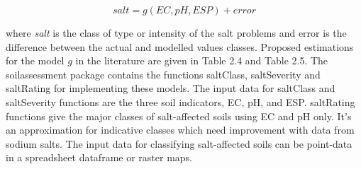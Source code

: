 \documentclass[
  10pt,
  b5paper,
]{book}
\newenvironment{Shaded}{\begin{snugshade}}{\end{snugshade}}
\newcommand{\CommentTok}[1]{\textcolor[rgb]{0.56,0.35,0.01}{\textit{#1}}}
\newcommand{\KeywordTok}[1]{\textcolor[rgb]{0.13,0.29,0.53}{\textbf{#1}}}
\newcommand{\NormalTok}[1]{#1}
\newcommand{\OperatorTok}[1]{\textcolor[rgb]{0.81,0.36,0.00}{\textbf{#1}}}
\newcommand{\StringTok}[1]{\textcolor[rgb]{0.31,0.60,0.02}{#1}}
\begin{document}
\begin{equation}
\tag{5.8}
salt = g(EC,pH,ESP) + error
\end{equation}

where \emph{salt} is the class of type or intensity of the salt problems and error is the difference between the actual and modelled values classes. Proposed estimations for the model \(g\) in the literature are given in Table 2.4 and Table 2.5. The soilassessment package contains the functions saltClass, saltSeverity and saltRating for implementing these models. The input data for saltClass and saltSeverity functions are the three soil indicators, EC, pH, and ESP. saltRating functions give the major classes of salt-affected soils using EC and pH only. It's an approximation for indicative classes which need improvement with data from sodium salts. The input data for classifying salt-affected soils can be point-data in a spreadsheet dataframe or raster maps.

\begin{Shaded}
\end{Shaded}
\end{document}
